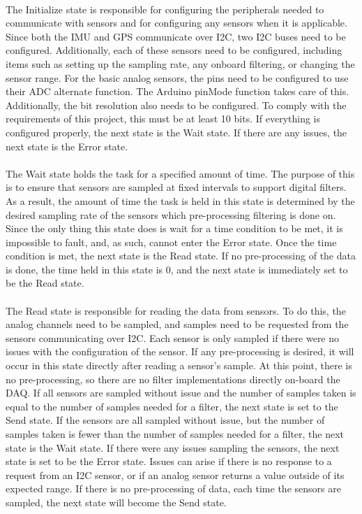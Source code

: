 \paragraph{}
The Initialize state is responsible for configuring the peripherals needed to communicate with sensors and for configuring any sensors when it is applicable.
Since both the IMU and GPS communicate over I2C, two I2C buses need to be configured.
Additionally, each of these sensors need to be configured, including items such as setting up the sampling rate, any onboard filtering, or changing the sensor range.
For the basic analog sensors, the pins need to be configured to use their ADC alternate function.
The Arduino pinMode function takes care of this.
Additionally, the bit resolution also needs to be configured.
To comply with the requirements of this project, this must be at least 10 bits.
If everything is configured properly, the next state is the Wait state.
If there are any issues, the next state is the Error state.

\paragraph{}
The Wait state holds the task for a specified amount of time.
The purpose of this is to ensure that sensors are sampled at fixed intervals to support digital filters.
As a result, the amount of time the task is held in this state is determined by the desired sampling rate of the sensors which pre-processing filtering is done on.
Since the only thing this state does is wait for a time condition to be met, it is impossible to fault, and, as such, cannot enter the Error state.
Once the time condition is met, the next state is the Read state.
If no pre-processing of the data is done, the time held in this state is 0, and the next state is immediately set to be the Read state.

\paragraph{}
The Read state is responsible for reading the data from sensors.
To do this, the analog channels need to be sampled, and samples need to be requested from the sensors communicating over I2C.
Each sensor is only sampled if there were no issues with the configuration of the sensor.
If any pre-processing is desired, it will occur in this state directly after reading a sensor's sample.
At this point, there is no pre-processing, so there are no filter implementations directly on-board the DAQ.
If all sensors are sampled without issue and the number of samples taken is equal to the number of samples needed for a filter, the next state is set to the Send state.
If the sensors are all sampled without issue, but the number of samples taken is fewer than the number of samples needed for a filter, the next state is the Wait state.
If there were any issues sampling the sensors, the next state is set to be the Error state.
Issues can arise if there is no response to a request from an I2C sensor, or if an analog sensor returns a value outside of its expected range.
If there is no pre-processing of data, each time the sensors are sampled, the next state will become the Send state.

